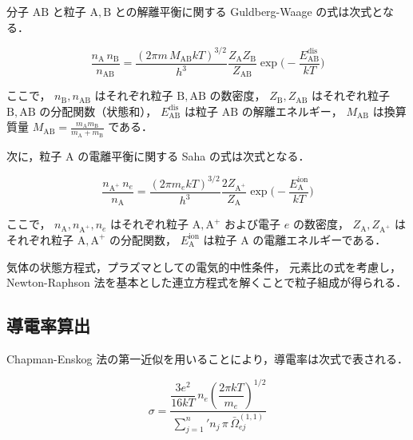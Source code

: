 \documentclass[dvipdfmx,report,uplatex]{jsbook}
\numberwithin{equation}{section}
\numberwithin{figure}{section}
\numberwithin{table}{section}
\begin{document}
分子 \( \mathrm{AB} \) と粒子 \( \mathrm{A}, \mathrm{B} \) との解離平衡に関する Guldberg-Waage の式は次式となる．

\begin{equation}
\frac{n_{\mathrm{A}} \, n_{\mathrm{B}}}{n_{\mathrm{AB}}} 
=
\frac{(2 \pi m \, M_{\mathrm{AB}} k T)^{3/2}}{h^3} 
\frac{Z_{\mathrm{A}} Z_{\mathrm{B}}}{Z_{\mathrm{AB}}} 
\exp\Biggl( - \frac{E_{\mathrm{AB}}^\mathrm{dis}}{kT} \Biggr)
\end{equation}

ここで，  
\(n_{\mathrm{B}}, n_{\mathrm{AB}}\) はそれぞれ粒子 \( \mathrm{B}, \mathrm{AB} \) の数密度，  
\(Z_{\mathrm{B}}, Z_{\mathrm{AB}}\) はそれぞれ粒子 \( \mathrm{B}, \mathrm{AB} \) の分配関数（状態和），  
\(E_{\mathrm{AB}}^\mathrm{dis}\) は粒子 \( \mathrm{AB} \) の解離エネルギー，  
\(M_{\mathrm{AB}}\) は換算質量 \(\displaystyle M_{\mathrm{AB}} = \frac{m_{\mathrm{A}} m_{\mathrm{B}}}{m_{\mathrm{A}} + m_{\mathrm{B}}}\) である．

次に，粒子 \( \mathrm{A} \) の電離平衡に関する Saha の式は次式となる．

\begin{equation}
\frac{n_{\mathrm{A^+}} \, n_e}{n_{\mathrm{A}}} 
=
\frac{(2 \pi m_e k T)^{3/2}}{h^3} 
\frac{2 Z_{\mathrm{A^+}}}{Z_{\mathrm{A}}} 
\exp\Biggl( - \frac{E_{\mathrm{A}}^\mathrm{ion}}{kT} \Biggr)
\end{equation}

ここで，  
\(n_{\mathrm{A}}, n_{\mathrm{A^+}}, n_e\) はそれぞれ粒子 \( \mathrm{A}, \mathrm{A^+} \) および電子 \( e \) の数密度，  
\(Z_{\mathrm{A}}, Z_{\mathrm{A^+}}\) はそれぞれ粒子 \( \mathrm{A}, \mathrm{A^+} \) の分配関数，  
\(E_{\mathrm{A}}^\mathrm{ion}\) は粒子 \( \mathrm{A} \) の電離エネルギーである．


気体の状態方程式，プラズマとしての電気的中性条件，
元素比の式を考慮し，Newton-Raphson 法を基本とした連立方程式を解くことで粒子組成が得られる\cite{作田忠裕1978銅蒸気混入による高温空気中の電子密度の増大}．
\subsection{導電率算出}
Chapman-Enskog 法の第一近似を用いることにより，導電率は次式で表される．

\begin{equation}
\sigma =
\frac{
  \dfrac{3 e^2}{16 k T} \, n_e 
  \left( \dfrac{2 \pi k T}{m_e} \right)^{1/2}
}{
  \sum\nolimits_{j=1}^{n}{}' n_j \, \pi \, \bar{\Omega}_{ej}^{(1,1)}
}
\end{equation}
\end{document}
